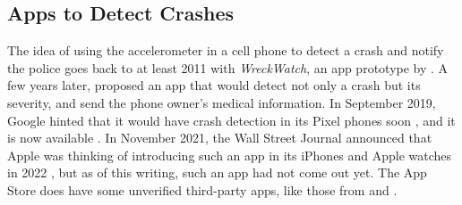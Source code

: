 \subsection{Apps to Detect Crashes}
The idea of using the accelerometer in a cell phone to detect a crash and notify the police goes back to at least 2011 with {\it WreckWatch}, an app prototype by \cite{RN29097389220110101}.  A few years later, \cite{edseee.692210720140801} proposed an app that would detect not only a crash but its severity, and send the phone owner's medical information.  In September 2019, Google hinted that it would have crash detection in its Pixel phones soon \citep{XDA}, and it is now available \citep{GooglePixelCrash}.  In November 2021, the Wall Street Journal announced that Apple was thinking of introducing such an app in its iPhones and Apple watches in 2022 \cite{edsgcl.68102971120211102}, but as of this writing, such an app had not come out yet.  The App Store does have some unverified third-party apps, like those from \cite{SOSmart} and \cite{Blink!}.

